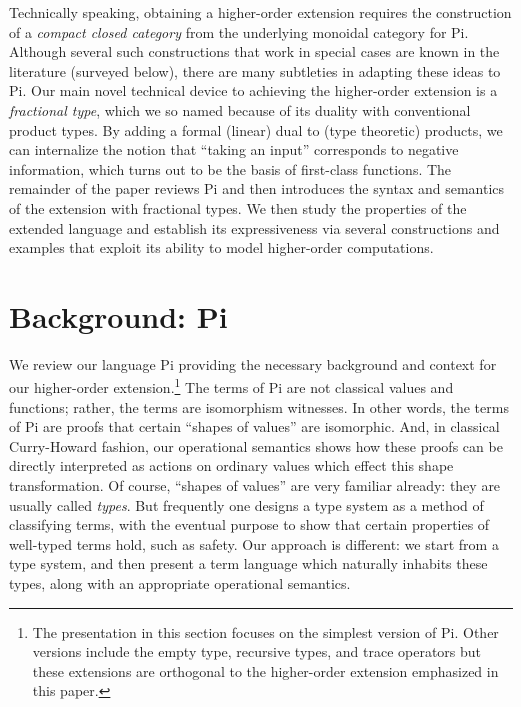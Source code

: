 \documentclass{llncs}
\newcommand{\roshan}[1]{\textsc{Roshan says:} 
  \textit{#1}
}
\begin{document}
Technically speaking, obtaining a higher-order extension requires the
construction of a \emph{compact closed category} from the underlying monoidal
category for {{Pi}}. Although several such constructions that work in special
cases are known in the literature (surveyed below), there are many subtleties
in adapting these ideas to {{Pi}}. Our main novel technical device to
achieving the higher-order extension is a \emph{fractional type}, which we so
named because of its duality with conventional product types.  By adding a
formal (linear) dual to (type theoretic) products, we can internalize the
notion that ``taking an input'' corresponds to negative information, which
turns out to be the basis of first-class functions. The remainder of the
paper reviews {{Pi}} and then introduces the syntax and semantics of the
extension with fractional types. We then study the properties of the extended
language and establish its expressiveness via several constructions and
examples that exploit its ability to model higher-order computations.


\section{Background: {{Pi}} }
\label{sec:pi}

We review our language {{Pi}} providing the necessary background and
context for our higher-order extension.\footnote{The presentation in this
  section focuses on the simplest version of {{Pi}}. Other versions
  include the empty type, recursive types, and trace operators but these
  extensions are orthogonal to the higher-order extension emphasized in this
  paper.} The terms of {{Pi}} are not classical values and functions;
rather, the terms are isomorphism witnesses.  In other words, the terms of
{{Pi}} are proofs that certain ``shapes of values'' are isomorphic.
And, in classical Curry-Howard fashion, our operational semantics shows how
these proofs can be directly interpreted as actions on ordinary values which
effect this shape transformation. Of course, ``shapes of values'' are very
familiar already: they are usually called \emph{types}.  But frequently one
designs a type system as a method of classifying terms, with the eventual
purpose to show that certain properties of well-typed terms hold, such as
safety.  Our approach is different: we start from a type system, and then
present a term language which naturally inhabits these types, along with an
appropriate operational semantics.
\end{document}
